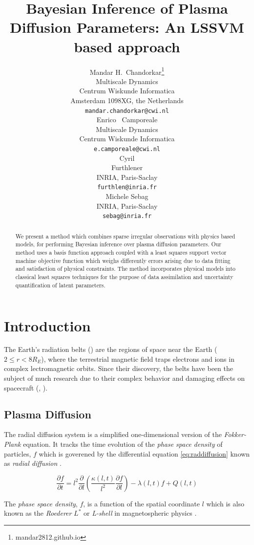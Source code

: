 \documentclass{article}
\title{Bayesian Inference of Plasma Diffusion Parameters: An LSSVM based approach}
\author{
  Mandar H.~Chandorkar\thanks{mandar2812.github.io} \\
  Multiscale Dynamics\\
  Centrum Wiskunde Informatica\\
  Amsterdam 1098XG, the Netherlands\\
  \texttt{mandar.chandorkar@cwi.nl} \\
   \And
   Enrico ~Camporeale \\
   Multiscale Dynamics \\
   Centrum Wiskunde Informatica \\
   \texttt{e.camporeale@cwi.nl} \\
   \AND
   Cyril \\
   Furthlener \\
   INRIA, Paris-Saclay \\
   \texttt{furthlen@inria.fr} \\
   \And
   Michele Sebag \\
   INRIA, Paris-Saclay \\
   \texttt{sebag@inria.fr} \\
}
\begin{document}

\maketitle

\begin{abstract}
 We present a method which combines sparse irregular observations with physics based models, 
 for performing Bayesian inference over plasma diffusion parameters. Our method uses a basis
 function approach coupled with a least squares support vector machine objective function which
 weighs differently errors arising due to data fitting and satisfaction of physical constraints.
 The method incorporates physical models into classical least squares techniques for the purpose
 of data assimilation and uncertainty quantification of latent parameters.
\end{abstract}

\section{Introduction}

The Earth's radiation belts (\citet{vanAllen}) are the regions of space near 
the Earth ($2 \leq r < 8 R_{E}$), where the terrestrial magnetic field traps 
electrons and ions in complex lectromagnetic orbits. Since their discovery,
the belts have been the subject of much research due to their complex behavior
and damaging effects on spacecraft (\citep{GUBBY20021723}, \citep{WellingSatellite}).

\subsection{Plasma Diffusion}

The radial diffusion system is a simplified one-dimensional version of
the \emph{Fokker-Plank} equation. It tracks the time evolution of the
\emph{phase space density} of particles, $f$ which is goverened by the
differential equation \ref{eq:raddiffusion} known as \emph{radial
  diffusion} \citep{JGRA:JGRA9345}.

\begin{equation}\label{eq:raddiffusion}
  \frac{\partial{f}}{\partial{t}} = l^2 \frac{\partial}{\partial{l}}\left( \frac{\kappa(l,
      t)}{l^{2}} \frac{\partial{f}}{\partial{l}} \right) - \lambda(l,
  t) f +  Q(l, t)
\end{equation}

The \emph{phase space density}, $f$, is a function of the spatial
coordinate $l$ which is also known as the \emph{Roederer} $L^*$ or
\emph{L-shell} in magnetospheric physics \citep{Roederer1970}.
\end{document}
